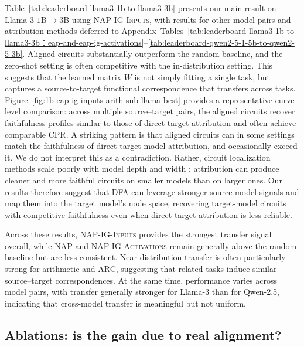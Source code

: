 \documentclass{article} %
\begin{document}
Table~\ref{tab:leaderboard-llama3-1b-to-llama3-3b} presents our main result on Llama-3 $1$B$\rightarrow3$B using \textsc{NAP-IG-Inputs}, with results for other model pairs and attribution methods deferred to Appendix~Tables~\ref{tab:leaderboard-llama3-1b-to-llama3-3b：eap-and-eap-ig-activations}--\ref{tab:leaderboard-qwen2-5-1-5b-to-qwen2-5-3b}. Aligned circuits substantially outperform the random baseline, and the zero-shot setting is often competitive with the in-distribution setting. This suggests that the learned matrix $W$ is not simply fitting a single task, but captures a source-to-target functional correspondence that transfers across tasks. Figure~\ref{fig:1b-eap-ig-inputs-arith-sub-llama-best} provides a representative curve-level comparison: across multiple source--target pairs, the aligned circuits recover faithfulness profiles similar to those of direct target attribution and often achieve comparable CPR. A striking pattern is that aligned circuits can in some settings match the faithfulness of direct target-model attribution, and occasionally exceed it. We do not interpret this as a contradiction. Rather, circuit localization methods scale poorly with model depth and width \citep{hanna2024eapig}: attribution can produce cleaner and more faithful circuits on smaller models than on larger ones. Our results therefore suggest that DFA can leverage stronger source-model signals and map them into the target model's node space, recovering target-model circuits with competitive faithfulness even when direct target attribution is less reliable.

Across these results, \textsc{NAP-IG-Inputs} provides the strongest transfer signal overall, while \textsc{NAP} and \textsc{NAP-IG-Activations} remain generally above the random baseline but are less consistent. Near-distribution transfer is often particularly strong for arithmetic and ARC, suggesting that related tasks induce similar source--target correspondences. At the same time, performance varies across model pairs, with transfer generally stronger for Llama-3 than for Qwen-2.5, indicating that cross-model transfer is meaningful but not uniform.











\subsection{Ablations: is the gain due to real alignment?}
\end{document}
